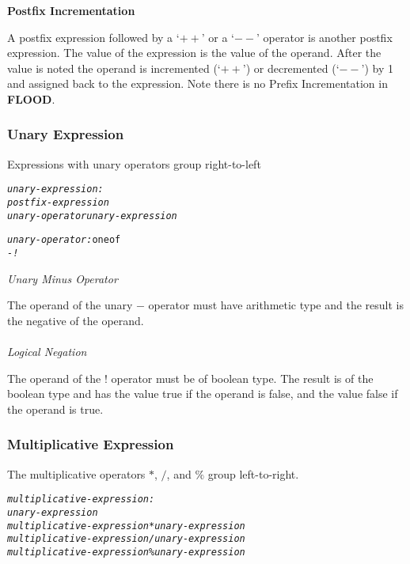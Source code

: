 \documentclass[12pt]{report}
\begin{document}
\begin{flushleft}
\textbf{Postfix Incrementation}
\end{flushleft}

A postfix expression followed by a `$++$' or a `$--$' operator is another postfix expression. The value of the expression is the value of the operand. After the value is noted the operand is incremented (`$++$') or decremented (`$--$') by 1 and assigned back to the expression. Note there is no Prefix Incrementation in \textbf{FLOOD}.

\subsubsection{Unary Expression}

Expressions with unary operators group right-to-left

\begin{alltt}\begin{singlespace}
         \textit{unary-expression:}
              \textit{postfix-expression}
              \textit{unary-operator unary-expression}
              
         \textit{unary-operator:} one of
              \textit{-}   \textit{!}\end{singlespace}
\end{alltt}
\textit{Unary Minus Operator}

The operand of the unary $-$ operator must have arithmetic type and the result is the negative of the operand.\\
\\
\textit{Logical Negation}

The operand of the $!$ operator must be of boolean type. The result is of the boolean type and has the value true if the operand is false, and the value false if the operand is true.

\subsubsection{Multiplicative Expression}

The multiplicative operators $*$, $/$, and $\%$ group left-to-right.
\begin{alltt}\begin{singlespace}
         \textit{multiplicative-expression:}
              \textit{unary-expression}
              \textit{multiplicative-expression * unary-expression}
              \textit{multiplicative-expression / unary-expression}
              \textit{multiplicative-expression \% unary-expression}\end{singlespace}
\end{alltt}
\end{document}
